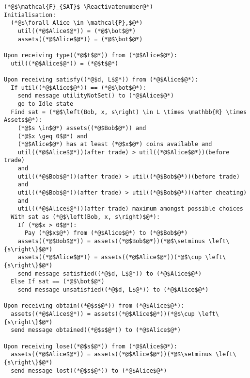 \Suppressnumber
\begin{lstlisting}[label=satfunc, style=numbers]
(*@$\mathcal{F}_{SAT}$ \Reactivatenumber@*)
Initialisation:
  (*@$\forall Alice \in \mathcal{P},$@*)
    util((*@$Alice$@*)) = (*@$\bot$@*)
    assets((*@$Alice$@*)) = (*@$\bot$@*)

Upon receiving type((*@$t$@*)) from (*@$Alice$@*):
  util((*@$Alice$@*)) = (*@$t$@*)

Upon receiving satisfy((*@$d, L$@*)) from (*@$Alice$@*):
  If util((*@$Alice$@*)) == (*@$\bot$@*):
    send message utilityNotSet() to (*@$Alice$@*)
    go to Idle state
  Find sat = (*@$\left(Bob, x, s\right) \in L \times \mathbb{R} \times Assets$@*):
    (*@$s \in$@*) assets((*@$Bob$@*)) and
    (*@$x \geq 0$@*) and
    (*@$Alice$@*) has at least (*@$x$@*) coins available and
    util((*@$Alice$@*))(after trade) > util((*@$Alice$@*))(before trade)
    and
    util((*@$Bob$@*))(after trade) > util((*@$Bob$@*))(before trade)
    and
    util((*@$Bob$@*))(after trade) > util((*@$Bob$@*))(after cheating)
    and
    util((*@$Alice$@*))(after trade) maximum amongst possible choices
  With sat as (*@$\left(Bob, x, s\right)$@*):
    If (*@$x > 0$@*):
      Pay (*@$x$@*) from (*@$Alice$@*) to (*@$Bob$@*)
    assets((*@$Bob$@*)) = assets((*@$Bob$@*))(*@$\setminus \left\{s\right\}$@*)
    assets((*@$Alice$@*)) = assets((*@$Alice$@*))(*@$\cup \left\{s\right\}$@*)
    send message satisfied((*@$d, L$@*)) to (*@$Alice$@*)
  Else If sat == (*@$\bot$@*)
    send message unsatisfied((*@$d, L$@*)) to (*@$Alice$@*)

Upon receiving obtain((*@$s$@*)) from (*@$Alice$@*):
  assets((*@$Alice$@*)) = assets((*@$Alice$@*))(*@$\cup \left\{s\right\}$@*)
  send message obtained((*@$s$@*)) to (*@$Alice$@*)

Upon receiving lose((*@$s$@*)) from (*@$Alice$@*):
  assets((*@$Alice$@*)) = assets((*@$Alice$@*))(*@$\setminus \left\{s\right\}$@*)
  send message lost((*@$s$@*)) to (*@$Alice$@*)
\end{lstlisting}
